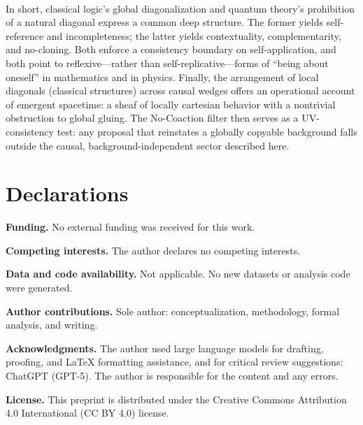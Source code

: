 \documentclass[11pt]{article}
\theoremstyle{upright}
\begin{document}
\paragraph{}
In short, classical logic’s global diagonalization and quantum theory’s prohibition of a natural diagonal express a common deep structure. The former yields self-reference and incompleteness; the latter yields contextuality, complementarity, and no-cloning. Both enforce a consistency boundary on self-application, and both point to reflexive---rather than self-replicative---forms of ``being about oneself'' in mathematics and in physics. Finally, the arrangement of local diagonals (classical structures) across causal wedges offers an operational account of emergent spacetime: a sheaf of locally cartesian behavior with a nontrivial obstruction to global gluing. The No-Coaction filter then serves as a UV-consistency test: any proposal that reinstates a globally copyable background falls outside the causal, background-independent sector described here.

\section*{Declarations}

\noindent\textbf{Funding.}
No external funding was received for this work.

\medskip
\noindent\textbf{Competing interests.}
The author declares no competing interests.

\medskip
\noindent\textbf{Data and code availability.}
Not applicable. No new datasets or analysis code were generated.

\medskip
\noindent\textbf{Author contributions.}
Sole author: conceptualization, methodology, formal analysis, and writing.

\medskip
\noindent\textbf{Acknowledgments.}
The author used large language models for drafting, proofing, and \LaTeX{} formatting assistance, and for critical review suggestions: ChatGPT (GPT-5). The author is responsible for the content and any errors.

\medskip
\noindent\textbf{License.}
This preprint is distributed under the Creative Commons Attribution 4.0 International (CC BY 4.0) license.




\end{document}
